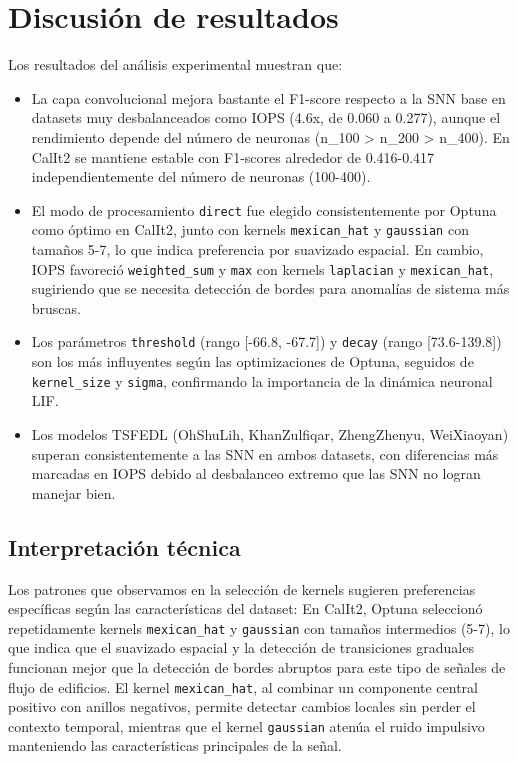 \section{Discusión de resultados}
Los resultados del análisis experimental muestran que:
\begin{itemize}
    \item La capa convolucional mejora bastante el F1-score respecto a la SNN base en datasets muy desbalanceados como IOPS (4.6x, de 0.060 a 0.277), aunque el rendimiento depende del número de neuronas (n\_100 > n\_200 > n\_400). En CalIt2 se mantiene estable con F1-scores alrededor de 0.416-0.417 independientemente del número de neuronas (100-400).
    \item El modo de procesamiento \texttt{direct} fue elegido consistentemente por Optuna como óptimo en CalIt2, junto con kernels \texttt{mexican\_hat} y \texttt{gaussian} con tamaños 5-7, lo que indica preferencia por suavizado espacial. En cambio, IOPS favoreció \texttt{weighted\_sum} y \texttt{max} con kernels \texttt{laplacian} y \texttt{mexican\_hat}, sugiriendo que se necesita detección de bordes para anomalías de sistema más bruscas.
    \item Los parámetros \texttt{threshold} (rango [-66.8, -67.7]) y \texttt{decay} (rango [73.6-139.8]) son los más influyentes según las optimizaciones de Optuna, seguidos de \texttt{kernel\_size} y \texttt{sigma}, confirmando la importancia de la dinámica neuronal LIF.
    \item Los modelos TSFEDL (OhShuLih, KhanZulfiqar, ZhengZhenyu, WeiXiaoyan) superan consistentemente a las SNN en ambos datasets, con diferencias más marcadas en IOPS debido al desbalanceo extremo que las SNN no logran manejar bien.
\end{itemize}

\subsection{Interpretación técnica}
Los patrones que observamos en la selección de kernels sugieren preferencias específicas según las características del dataset:
En CalIt2, Optuna seleccionó repetidamente kernels \texttt{mexican\_hat} y \texttt{gaussian} con tamaños intermedios (5-7), lo que indica que el suavizado espacial y la detección de transiciones graduales funcionan mejor que la detección de bordes abruptos para este tipo de señales de flujo de edificios. El kernel \texttt{mexican\_hat}, al combinar un componente central positivo con anillos negativos, permite detectar cambios locales sin perder el contexto temporal, mientras que el kernel \texttt{gaussian} atenúa el ruido impulsivo manteniendo las características principales de la señal.

